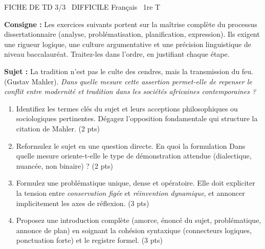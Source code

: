 \documentclass[11pt]{article}
\begin{document}
\begin{tcolorbox}[enhanced,colback=popink,colframe=popink,arc=10pt,boxrule=0pt,left=12pt,right=12pt,top=9pt,bottom=9pt]
{\color{white}\popxbold\small FICHE DE TD 3/3 \textbullet\ DIFFICILE \hfill Français \textbullet\ 1re T\par}
\end{tcolorbox}
\vspace{4pt}
\noindent \textbf{Consigne :} Les exercices suivants portent sur la maîtrise complète du processus dissertationnaire (analyse, problématisation, planification, expression). Ils exigent une rigueur logique, une culture argumentative et une précision linguistique de niveau baccalauréat. Traitez-les dans l'ordre, en justifiant chaque étape.

\begin{exercice}
\textbf{Sujet :} \og La tradition n'est pas le culte des cendres, mais la transmission du feu.\fg{} (Gustav Mahler). \textit{Dans quelle mesure cette assertion permet-elle de repenser le conflit entre modernité et tradition dans les sociétés africaines contemporaines ?}

\begin{enumerate}
    \item Identifiez les termes clés du sujet et leurs acceptions philosophiques ou sociologiques pertinentes. Dégagez l'opposition fondamentale qui structure la citation de Mahler. (2 pts)
    \item Reformulez le sujet en une question directe. En quoi la formulation \og Dans quelle mesure \fg{} oriente-t-elle le type de démonstration attendue (dialectique, nuancée, non binaire) ? (2 pts)
    \item Formulez une problématique unique, dense et opératoire. Elle doit expliciter la tension entre \textit{conservation figée} et \textit{réinvention dynamique}, et annoncer implicitement les axes de réflexion. (3 pts)
    \item Proposez une introduction complète (amorce, énoncé du sujet, problématique, annonce de plan) en soignant la cohésion syntaxique (connecteurs logiques, ponctuation forte) et le registre formel. (3 pts)
\end{enumerate}
\end{exercice}
\end{document}
